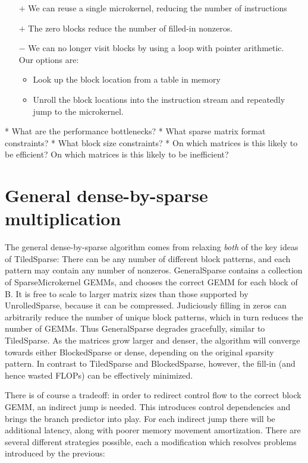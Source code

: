 {  \begin{itemize}
  \item[$+$] We can reuse a single microkernel, reducing the number of instructions
  \item[$+$] The zero blocks reduce the number of filled-in nonzeros.
  \item[$-$] We can no longer visit blocks by using a loop with pointer arithmetic. \\Our options are:
    \begin{itemize}
    \item Look up the block location from a table in memory
    \item Unroll the block locations into the instruction stream and repeatedly jump to the microkernel.
    \end{itemize}
  \end{itemize}




* What are the performance bottlenecks?
* What sparse matrix format constraints?
* What block size constraints?
* On which matrices is this likely to be efficient? On which matrices is this likely to be inefficient?


\section{General dense-by-sparse multiplication}

The general dense-by-sparse algorithm comes from relaxing \emph{both} of the key ideas of TiledSparse: There can be any number of different block patterns, and each pattern may contain any number of nonzeros. GeneralSparse contains a collection of SparseMicrokernel GEMMs, and chooses the correct GEMM for each block of B. It is free to scale to larger matrix sizes than those supported by UnrolledSparse, because it can be compressed. Judiciously filling in zeros can arbitrarily reduce the number of unique block patterns, which in turn reduces the number of GEMMs. Thus GeneralSparse degrades gracefully, similar to TiledSparse. As the matrices grow larger and denser, the algorithm will converge towards either BlockedSparse or dense, depending on the original sparsity pattern. In contrast to TiledSparse and BlockedSparse, however, the fill-in (and hence wasted FLOPs) can be effectively minimized.

There is of course a tradeoff: in order to redirect control flow to the correct block GEMM, an indirect jump is needed. This introduces control dependencies and brings the branch predictor into play. For each indirect jump there will be additional latency, along with poorer memory movement amortization. There are several different strategies possible, each a modification which resolves problems introduced by the previous:

}
